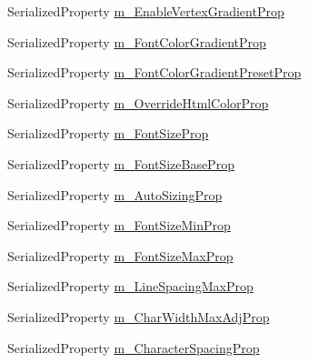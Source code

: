 \begin{DoxyCompactItemize}
\item 
Serialized\+Property \mbox{\hyperlink{class_t_m_pro_1_1_editor_utilities_1_1_t_m_p___base_editor_panel_a4bf6ab0503f8bc889c375fe4be5e7afa}{m\+\_\+\+Enable\+Vertex\+Gradient\+Prop}}
\item 
Serialized\+Property \mbox{\hyperlink{class_t_m_pro_1_1_editor_utilities_1_1_t_m_p___base_editor_panel_a48df9bda1abce6e13fc4df0a378a399c}{m\+\_\+\+Font\+Color\+Gradient\+Prop}}
\item 
Serialized\+Property \mbox{\hyperlink{class_t_m_pro_1_1_editor_utilities_1_1_t_m_p___base_editor_panel_a6214bd691c4dbd95696a6043b9cfa343}{m\+\_\+\+Font\+Color\+Gradient\+Preset\+Prop}}
\item 
Serialized\+Property \mbox{\hyperlink{class_t_m_pro_1_1_editor_utilities_1_1_t_m_p___base_editor_panel_a870b282429c9c48f5a8896f50c80e74d}{m\+\_\+\+Override\+Html\+Color\+Prop}}
\item 
Serialized\+Property \mbox{\hyperlink{class_t_m_pro_1_1_editor_utilities_1_1_t_m_p___base_editor_panel_a91a14254b218038849d1636674ef08bd}{m\+\_\+\+Font\+Size\+Prop}}
\item 
Serialized\+Property \mbox{\hyperlink{class_t_m_pro_1_1_editor_utilities_1_1_t_m_p___base_editor_panel_aecda0ca14c77370317190bd66a76ba84}{m\+\_\+\+Font\+Size\+Base\+Prop}}
\item 
Serialized\+Property \mbox{\hyperlink{class_t_m_pro_1_1_editor_utilities_1_1_t_m_p___base_editor_panel_aa73b2f77bf48e54594e3a18501abd1c0}{m\+\_\+\+Auto\+Sizing\+Prop}}
\item 
Serialized\+Property \mbox{\hyperlink{class_t_m_pro_1_1_editor_utilities_1_1_t_m_p___base_editor_panel_a99c7a7b8d94fa689d624aa91095cd6cc}{m\+\_\+\+Font\+Size\+Min\+Prop}}
\item 
Serialized\+Property \mbox{\hyperlink{class_t_m_pro_1_1_editor_utilities_1_1_t_m_p___base_editor_panel_aba910b0091e45b29b82f274f7a469ba3}{m\+\_\+\+Font\+Size\+Max\+Prop}}
\item 
Serialized\+Property \mbox{\hyperlink{class_t_m_pro_1_1_editor_utilities_1_1_t_m_p___base_editor_panel_a2a0ebb17cc51b8ce10410e279f69b524}{m\+\_\+\+Line\+Spacing\+Max\+Prop}}
\item 
Serialized\+Property \mbox{\hyperlink{class_t_m_pro_1_1_editor_utilities_1_1_t_m_p___base_editor_panel_a3356e390ce3396ce4f45413793c2801f}{m\+\_\+\+Char\+Width\+Max\+Adj\+Prop}}
\item 
Serialized\+Property \mbox{\hyperlink{class_t_m_pro_1_1_editor_utilities_1_1_t_m_p___base_editor_panel_ab4cd5844e7dbdcb3dd25dbf4878fe97d}{m\+\_\+\+Character\+Spacing\+Prop}}

\end{DoxyCompactItemize}
